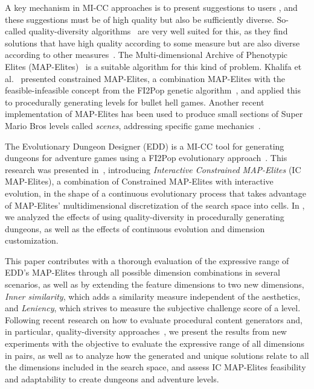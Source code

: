 A key mechanism in MI-CC approaches is to present suggestions to users%
, and these suggestions must be of high quality but also be sufficiently diverse. So-called quality-diversity algorithms~\cite{p6Pugh2016} are very well suited for this, as they find solutions that have high quality according to some measure but are also diverse according to other measures~\cite{p6gravina2019procedural}. The Multi-dimensional Archive of Phenotypic Elites (MAP-Elites)~\cite{p6Mouret2015} is a suitable algorithm for this kind of problem. Khalifa et al.~\cite{p6Khalifa2018} presented constrained MAP-Elites, a combination MAP-Elites with the feasible-infeasible concept from the FI2Pop genetic algorithm~\cite{p6Kimbrough2008}, and applied this to procedurally generating levels for bullet hell games. %
Another recent implementation of MAP-Elites has been used to produce small sections of Super Mario Bros levels called \textit{scenes}, addressing specific game mechanics~\cite{p6Khalifa2019-intentionalCompLevel}.

The Evolutionary Dungeon Designer (EDD) is a MI-CC tool for generating dungeons for adventure games using a FI2Pop evolutionary approach~\cite{p6Alvarez2018, Alvarez2018a, Baldwin2017, Baldwin2017a}. This %
research was presented in~\cite{p6alvarez2019empowering}, %
introducing \emph{Interactive Constrained MAP-Elites} (IC MAP-Elites), a combination of Constrained MAP-Elites with interactive evolution, in the shape of %
a continuous evolutionary process that takes advantage of MAP-Elites' multidimensional discretization of the search space into cells. %
In \cite{p6alvarez2019empowering}, we analyzed the effects of using quality-diversity in procedurally generating dungeons, as well as the effects of continuous evolution and dimension customization.%

This paper contributes with %
a thorough evaluation of the expressive range of EDD's MAP-Elites through all possible dimension combinations in several scenarios, as well as by extending the feature dimensions to %
two new dimensions, \emph{Inner similarity}, which adds a similarity measure independent of the aesthetics, and \emph{Leniency}, which strives to measure the subjective challenge score of a level. Following recent research on how to evaluate procedural content generators and, in particular, quality-diversity approaches~\cite{p6Cook2019:ParameterBasedEvaluation,Cook2016-SecondPaperDanesh,Gravina2019-blendingNotionsDiversity}, we present the results from new experiments %
with the objective to evaluate the expressive range of all dimensions in pairs, as well as to analyze how the generated and unique solutions relate to all the dimensions included in the search space, and assess IC MAP-Elites feasibility and adaptability to create dungeons and adventure levels.

